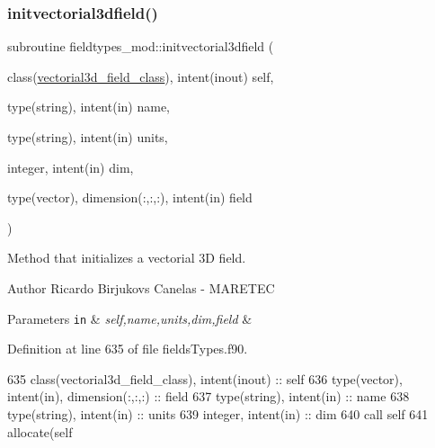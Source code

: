 \subsubsection{\texorpdfstring{initvectorial3dfield()}{initvectorial3dfield()}}
{\footnotesize\ttfamily subroutine fieldtypes\+\_\+mod\+::initvectorial3dfield (\begin{DoxyParamCaption}\item[{class(\mbox{\hyperlink{structfieldtypes__mod_1_1vectorial3d__field__class}{vectorial3d\+\_\+field\+\_\+class}}), intent(inout)}]{self,  }\item[{type(string), intent(in)}]{name,  }\item[{type(string), intent(in)}]{units,  }\item[{integer, intent(in)}]{dim,  }\item[{type(vector), dimension(\+:,\+:,\+:), intent(in)}]{field }\end{DoxyParamCaption})\hspace{0.3cm}{\ttfamily [private]}}



Method that initializes a vectorial 3D field. 

\begin{DoxyAuthor}{Author}
Ricardo Birjukovs Canelas -\/ M\+A\+R\+E\+T\+EC 
\end{DoxyAuthor}

\begin{DoxyParams}[1]{Parameters}
\mbox{\tt in}  & {\em self,name,units,dim,field} & \\
\hline
\end{DoxyParams}


Definition at line 635 of file fields\+Types.\+f90.


\begin{DoxyCode}
635     \textcolor{keywordtype}{class}(vectorial3d\_field\_class), \textcolor{keywordtype}{intent(inout)} :: self
636     \textcolor{keywordtype}{type}(vector), \textcolor{keywordtype}{intent(in)}, \textcolor{keywordtype}{dimension(:,:,:)} :: field
637     \textcolor{keywordtype}{type}(string), \textcolor{keywordtype}{intent(in)} :: name
638     \textcolor{keywordtype}{type}(string), \textcolor{keywordtype}{intent(in)} :: units
639     \textcolor{keywordtype}{integer}, \textcolor{keywordtype}{intent(in)} :: dim
640     \textcolor{keyword}{call }self%
641     \textcolor{keyword}{allocate}(self%
\end{DoxyCode}
\mbox{\label{namespacefieldtypes__mod_ad458710e4a2d6c40a3dfa7f19481cd5a}} 
